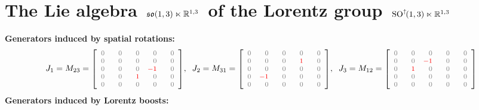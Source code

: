 
\vskip 0.5cm
\section{The Lie algebra \,$\mathfrak{so}(1,3) \ltimes \mathbb{R}^{1,3}$\, of the Lorentz group \,$\nobreak{\textnormal{SO}^{\uparrow\!}(1,3) \ltimes \mathbb{R}^{1,3}}$}

\noindent
\textbf{Generators induced by spatial rotations:}
\begin{equation*}
J_{1} = M_{23} = \textnormal{\footnotesize$\left[{\color{gray}
		\begin{array}{rrrrr}
		0 & {\color{white}-}0 & {\color{white}-}0 & {\color{white}-}0 & {\color{white}-}0 \\
		0 & 0 & 0 & 0 & 0\\
		0 & 0 & 0 & {\color{red}-1} & 0 \\
		0 & 0 & {\color{red}1} & 0 & 0 \\
		0 & 0 & 0 & 0 & 0 \\
		\end{array}
		}\right]$},
\;\;
J_{2} = M_{31} = \textnormal{\footnotesize$\left[{\color{gray}
	\begin{array}{rrrrr}
	0 & {\color{white}-}0 & {\color{white}-}0 & {\color{white}-}0 & {\color{white}-}0 \\
	0 & 0 & 0 & {\color{red}1} & 0 \\
	0 & 0 & 0 & 0 & 0 \\
	0 & {\color{red}-1} & 0 & 0 & 0 \\
	0 & 0 & 0 & 0 & 0 \\
	\end{array}
	}\right]$},
\;\;
J_{3} = M_{12} = \textnormal{\footnotesize$\left[{\color{gray}
	\begin{array}{rrrrr}
	0 & {\color{white}-}0 & {\color{white}-}0 & {\color{white}-}0 & {\color{white}-}0 \\
	0 & 0 & {\color{red}-1} & 0 & 0 \\
	0 & {\color{red}1} & 0 & 0 & 0 \\
	0 & 0 & 0 & 0 & 0 \\
	0 & 0 & 0 & 0 & 0 \\
	\end{array}
	}\right]$}
\end{equation*}
\textbf{Generators induced by Lorentz boosts:}
